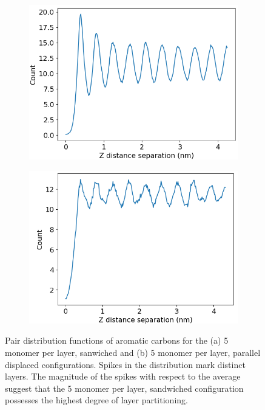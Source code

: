 \documentclass{article}
\begin{document}
  \begin{figure}[h]
	\centering
	\begin{subfigure}{0.45\textwidth}
		\centering
		\includegraphics[width=\textwidth]{zdf5layered.png}
		\caption{}\label{fig:zdf_layered}
	\end{subfigure}
	\begin{subfigure}{0.45\textwidth}
		\centering
		\includegraphics[width=\textwidth]{zdf5offset.png}
		\caption{}\label{fig:zdf_offset}
	\end{subfigure}
	\caption{Pair distribution functions of aromatic carbons for the
	(a) 5 monomer per layer, sanwiched and (b) 5 monomer per layer, 
	parallel displaced configurations. Spikes in the distribution mark
	distinct layers. The magnitude of the spikes with respect to the 
	average suggest that the 5 monomer per layer, sandwiched configuration
	possesses the highest degree of layer partitioning.}\label{fig:zdf}
  \end{figure}
\end{document}

